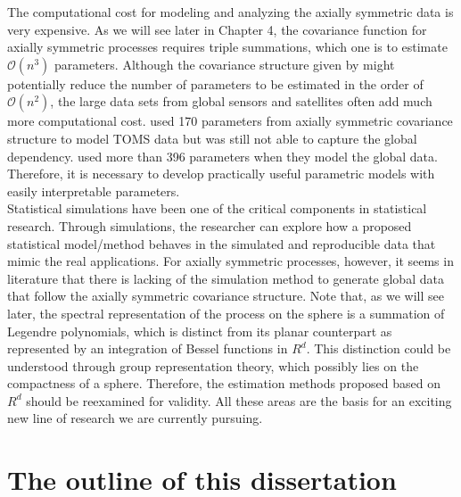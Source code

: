 The computational cost for modeling and analyzing the axially symmetric data is very expensive. As we will see later in Chapter 4, the covariance function for axially symmetric processes requires triple summations, which one is to estimate $\mathcal{O}(n^3)$ parameters. Although the covariance structure given by \cite{Huang2012} might potentially reduce the number of parameters to be estimated in the order of $\mathcal{O}(n^2)$, the large data sets from global sensors and satellites often add much more computational cost. \cite{Stein2007} used 170 parameters from axially symmetric covariance structure to model TOMS data but was still not able to capture the global dependency. \cite{CressieJohannesson2008} used more than 396 parameters when they model the global data. Therefore, it is necessary to develop practically useful parametric models with easily interpretable parameters. \\

Statistical simulations have been one of the critical components in statistical research. Through simulations, the researcher can explore how a proposed statistical model/method behaves in the simulated and reproducible data that mimic the real applications. For axially symmetric processes, however, it seems in literature that there is lacking of the simulation method to generate global data that follow the axially symmetric covariance structure. Note that, as we will see later, the spectral representation of the process on the sphere is a summation of Legendre polynomials, which is distinct from its planar counterpart as represented by an integration of Bessel functions in $R^d$. This distinction could be understood through group representation theory, which possibly lies on the compactness of a sphere. Therefore, the estimation methods proposed based on $R^d$ should be reexamined for validity. All these areas are the basis for an exciting new line of research we are currently pursuing.

\section{The outline of this dissertation}


